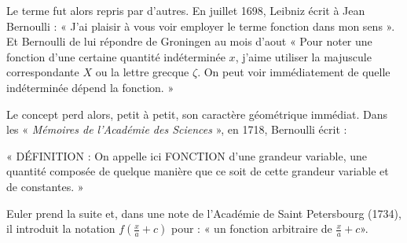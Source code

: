 \begin{His}
\vspace{0.4cm}
Le terme fut alors repris par d’autres. En juillet 1698,  Leibniz écrit à  Jean Bernoulli :   «   J’ai   plaisir   à   vous   voir   
employer  le  terme  fonction  dans  mon  sens  ».  Et  Bernoulli  de  lui  répondre  de  Groningen  au  mois  d'aout  «  Pour  noter  
une   fonction   d’une   certaine   quantité indéterminée $x$, j’aime  utiliser  la majuscule  correspondante  $X$  ou  la lettre  grecque $\zeta$. On peut voir immédiatement de quelle indéterminée dépend la fonction. » 

\vspace{0.4cm}

Le  concept  perd  alors,  petit  à  petit,  son  caractère géométrique immédiat. Dans  les  « \textit{ Mémoires  de  l’Académie  des 
Sciences} », en 1718, Bernoulli écrit : 

« DÉFINITION  :    On  appelle  ici FONCTION  d’une  grandeur  variable, une   quantité   composée   de   quelque   manière  que  ce  soit  de  cette  grandeur  variable et de constantes. » 

\vspace{0.4cm}

Euler prend la suite et, dans une note de l’Académie de Saint Petersbourg (1734), il  introduit  la  notation  $f\left( \frac{x}{a}+c \right)$ pour : « un fonction arbitraire de $\frac{x}{a}+c$».
 
 
\end{His}
